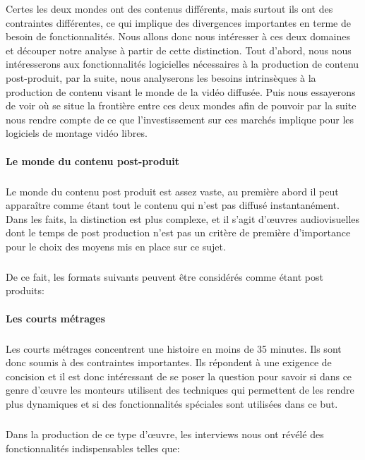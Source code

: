 Certes les deux mondes ont des contenus différents, mais surtout
ils ont des contraintes différentes, ce qui implique des divergences
importantes en terme de besoin de fonctionnalités. Nous allons donc
nous intéresser à ces deux domaines et découper notre analyse à
partir de cette distinction. Tout d'abord, nous nous intéresserons aux
fonctionnalités logicielles nécessaires à la production de contenu
post-produit, par la suite, nous analyserons les besoins intrinsèques
à la production de contenu visant le monde de la vidéo diffusée. Puis
nous essayerons de voir où se situe la frontière entre ces deux mondes
afin de pouvoir par la suite nous rendre compte de ce que l'investissement
sur ces marchés implique pour les logiciels de montage vidéo libres.

\paragraph{Le monde du contenu post-produit}

\subparagraph{}

Le monde du contenu post produit est assez vaste, au première abord
il peut apparaître comme étant tout le contenu qui n'est pas diffusé
instantanément. Dans les faits, la distinction est plus complexe, et il
s'agit d'œuvres audiovisuelles dont le temps de post production n'est
pas un critère de première d'importance pour le choix des moyens mis
en place sur ce sujet.

\subparagraph{}

De ce fait, les formats suivants peuvent être considérés comme étant
post produits:

\paragraph{Les courts métrages}

\subparagraph{}

Les courts métrages concentrent une histoire en moins de 35 minutes. Ils
sont donc soumis à des contraintes importantes. Ils répondent à
une exigence de concision et il est donc intéressant de se poser la
question pour savoir si dans ce genre d'œuvre les monteurs utilisent
des techniques qui permettent de les rendre plus dynamiques et si des
fonctionnalités spéciales sont utilisées dans ce but.

\subparagraph{}

Dans la production de ce type d'œuvre, les interviews nous ont révélé
des fonctionnalités indispensables telles que:


